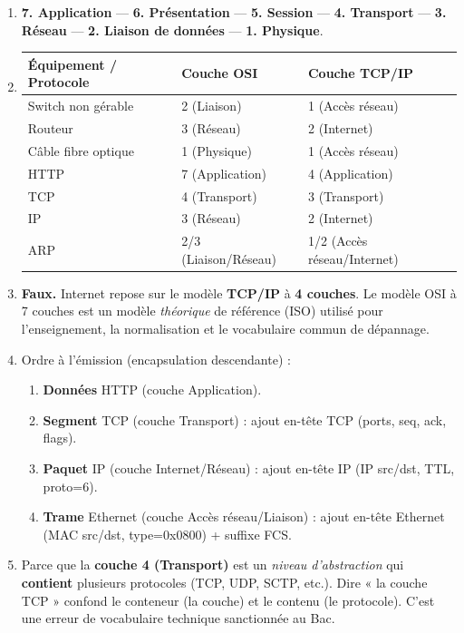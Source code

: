 \documentclass[11pt]{article}
\begin{document}
\begin{corrige}
\begin{enumerate}
\item \textbf{7. Application} — \textbf{6. Présentation} — \textbf{5. Session} — \textbf{4. Transport} — \textbf{3. Réseau} — \textbf{2. Liaison de données} — \textbf{1. Physique}.
\item
\begin{center}
\begin{tabularx}{\linewidth}{|l|X|X|}
\hline
\rowcolor{popblueL} \textbf{Équipement / Protocole} & \textbf{Couche OSI} & \textbf{Couche TCP/IP} \\
\hline
Switch non gérable & 2 (Liaison) & 1 (Accès réseau) \\
\hline
Routeur & 3 (Réseau) & 2 (Internet) \\
\hline
Câble fibre optique & 1 (Physique) & 1 (Accès réseau) \\
\hline
HTTP & 7 (Application) & 4 (Application) \\
\hline
TCP & 4 (Transport) & 3 (Transport) \\
\hline
IP & 3 (Réseau) & 2 (Internet) \\
\hline
ARP & 2/3 (Liaison/Réseau) & 1/2 (Accès réseau/Internet) \\
\hline
\end{tabularx}
\end{center}
\item \textbf{Faux.} Internet repose sur le modèle \textbf{TCP/IP} à \textbf{4 couches}. Le modèle OSI à 7 couches est un modèle \emph{théorique} de référence (ISO) utilisé pour l'enseignement, la normalisation et le vocabulaire commun de dépannage.
\item Ordre à l'émission (encapsulation descendante) :
\begin{enumerate}
\item \textbf{Données} HTTP (couche Application).
\item \textbf{Segment} TCP (couche Transport) : ajout en-tête TCP (ports, seq, ack, flags).
\item \textbf{Paquet} IP (couche Internet/Réseau) : ajout en-tête IP (IP src/dst, TTL, proto=6).
\item \textbf{Trame} Ethernet (couche Accès réseau/Liaison) : ajout en-tête Ethernet (MAC src/dst, type=0x0800) + suffixe FCS.
\end{enumerate}
\item Parce que la \textbf{couche 4 (Transport)} est un \emph{niveau d'abstraction} qui \textbf{contient} plusieurs protocoles (TCP, UDP, SCTP, etc.). Dire « la couche TCP » confond le conteneur (la couche) et le contenu (le protocole). C'est une erreur de vocabulaire technique sanctionnée au Bac.
\end{enumerate}
\end{corrige}
\end{document}
